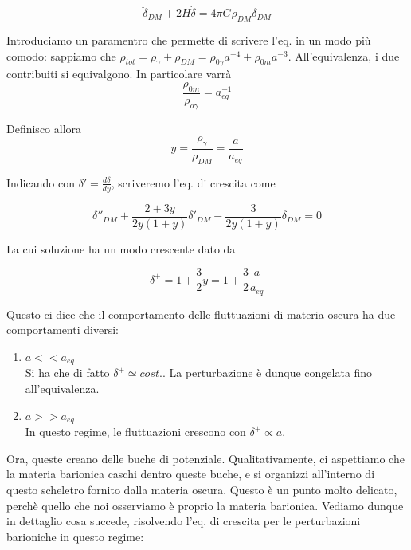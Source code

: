\documentclass{report}
\begin{document}
\begin{equation}
    \ddot{\delta}_{DM} + 2H\dot{\delta} = 4\pi G \rho_{DM}\delta_{DM}
\end{equation}

Introduciamo un paramentro che permette di scrivere l'eq. in un modo più comodo: sappiamo che $\rho_{tot} = \rho_\gamma + \rho_{DM} = \rho_{0\gamma}a^{-4} + \rho_{0m}a^{-3}$. All'equivalenza, i due contribuiti si equivalgono. In particolare varrà 
\begin{equation}
    \frac{\rho_{0m}}{\rho_{o\gamma}} = a_{eq}^{-1}
\end{equation}

Definisco allora 
\begin{equation}
    y = \frac{\rho_\gamma}{\rho_{DM}} = \frac{a}{a_{eq}}
\end{equation}

Indicando con $\delta' = \frac{d\delta}{dy}$, scriveremo l'eq. di crescita come 

\begin{equation}
    \delta''_{DM} + \frac{2+3y}{2y(1+y)}\delta'_{DM} - \frac{3}{2y(1+y)}\delta_{DM} = 0
\end{equation}

La cui soluzione ha un modo crescente dato da 

\begin{tcolorbox}[colback=gray!15, colframe=black, boxrule=1pt]
\begin{equation}
    \delta^+ = 1 + \frac{3}{2}y = 1+ \frac{3}{2}\frac{a}{a_{eq}}
\end{equation}
\end{tcolorbox}

Questo ci dice che il comportamento delle fluttuazioni di materia oscura ha due comportamenti diversi: 

\begin{enumerate}
    \item $a << a_{eq}$ \\
    Si ha che di fatto $\delta^+ \simeq cost. $. La perturbazione è dunque congelata fino all'equivalenza. 
    \item $a >> a_{eq}$ \\
    In questo regime, le fluttuazioni crescono con $\delta^+ \propto a$. 
\end{enumerate}

Ora, queste creano delle buche di potenziale. Qualitativamente, ci aspettiamo che la materia barionica caschi dentro queste buche, e si organizzi all'interno di questo scheletro fornito dalla materia oscura. Questo è un punto molto delicato, perchè quello che noi osserviamo è proprio la materia barionica. Vediamo dunque in dettaglio cosa succede, risolvendo l'eq. di crescita per le perturbazioni barioniche in questo regime: \\
\end{document}
